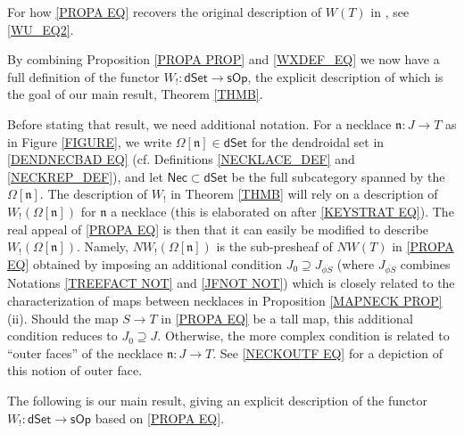 \documentclass[a4paper,10pt
,draft
]{article}%
\numberwithin{equation}{section}
\numberwithin{figure}{section}
\theoremstyle{definition} %
\newcommand{\sOp}{\ensuremath{\mathsf{sOp}}}%
\newcommand{\dSet}{\mathsf{dSet}}
\newcommand{\1}{\ensuremath{\mathbbm 1}}%
\begin{document}
For how \eqref{PROPA EQ}
recovers the original description of $W(T)$ in \cite[(4.1)]{CM13b},
see \eqref{WU_EQ2}.

\vskip 10pt


	By combining Proposition \ref{PROPA PROP} and \eqref{WXDEF_EQ}
	we now have a full definition of the functor
	$W_! \colon \mathsf{dSet} \to \sOp$,
	the explicit description of which is the goal of our main result, Theorem \ref{THMB}.

	
	Before stating that result, we need additional notation.
	For a necklace $\mathfrak{n}\colon J \to T$ as in Figure \ref{FIGURE},
	we write $\Omega[\mathfrak{n}] \in \dSet$
	for the dendroidal set in \eqref{DENDNECBAD EQ}
	(cf. Definitions \ref{NECKLACE_DEF} 
	and \ref{NECKREP_DEF}),
	and let $\mathsf{Nec} \subset \dSet$
	be the full subcategory spanned by the $\Omega[\mathfrak{n}]$. 
	The description of $W_!$ in Theorem \ref{THMB}
	will rely on a description 
	of $W_!(\Omega[\mathfrak{n}])$
	for $\mathfrak{n}$ a necklace 
	(this is elaborated on after \eqref{KEYSTRAT EQ}).
	The real appeal of \eqref{PROPA EQ}
	is then that it can easily be modified to describe
	$W_!(\Omega[\mathfrak{n}])$.
	Namely,
	$N W_!(\Omega[\mathfrak{n}])$ is the sub-presheaf of 
	$NW(T)$ in \eqref{PROPA EQ}
	obtained by imposing an additional condition
	$J_0 \supseteq J_{\overline{\phi S}}$
	(where $J_{\overline{\phi S}}$ combines
	Notations \ref{TREEFACT NOT} and \ref{JFNOT NOT})
	which is closely related to the characterization of 
	maps between necklaces
	in Proposition \ref{MAPNECK PROP}(ii).
	Should the map $S\to T$ in \eqref{PROPA EQ} be a tall map,
	this additional condition reduces to $J_0 \supseteq J$.
	Otherwise, the more complex condition is related to 
	``outer faces'' of the necklace $\mathfrak{n}\colon J\to T$.
	See \eqref{NECKOUTF EQ} for a depiction of this notion
	of outer face.


The following is our main result, 
giving an explicit description of the
functor $W_!\colon \mathsf{dSet} \to \mathsf{sOp}$
based on \eqref{PROPA EQ}.
\end{document}
